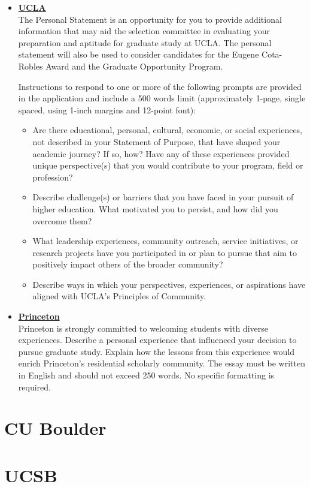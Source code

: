 \documentclass[12font]{article}
\numberwithin{equation}{section}    %
\begin{document}
{\begin{itemize}
        A minimum word count of 250 words is required for your Personal History Statement. There is no maximum length requirement. Most statements are typically 1–2 pages. Your Personal History Statement must be written in narrative (essay) form without duplicating content from your Statement of Purpose.
    \item \textbf{\underline{UCLA}} \\
        The Personal Statement is an opportunity for you to provide additional information that may aid the selection committee in evaluating your preparation and aptitude for graduate study at UCLA. The personal statement will also be used to consider candidates for the Eugene Cota-Robles Award and the Graduate Opportunity Program.

        Instructions to respond to one or more of the following prompts are provided in the application and include a 500 words limit (approximately 1-page, single spaced, using 1-inch margins and 12-point font):
        \begin{itemize}
            \item Are there educational, personal, cultural, economic, or social experiences, not described in your Statement of Purpose, that have shaped your academic journey? If so, how? Have any of these experiences provided unique perspective(s) that you would contribute to your program, field or profession?
            \item Describe challenge(s) or barriers that you have faced in your pursuit of higher education. What motivated you to persist, and how did you overcome them?
            \item What leadership experiences, community outreach, service initiatives, or research projects have you participated in or plan to pursue that aim to positively impact others of the broader community?
            \item Describe ways in which your perspectives, experiences, or aspirations have aligned with UCLA’s Principles of Community.
        \end{itemize}
    \item \textbf{\underline{Princeton}}    \\
        Princeton is strongly committed to welcoming students with diverse experiences. Describe a personal experience that influenced your decision to pursue graduate study. Explain how the lessons from this experience would enrich Princeton’s residential scholarly community. The essay must be written in English and should not exceed 250 words. No specific formatting is required.

\end{itemize}
}

\section*{CU Boulder}
\begin{multicols}{2}
    
\end{multicols}

\section*{UCSB}
\begin{multicols}{2}
    
\end{multicols}
\end{document}
